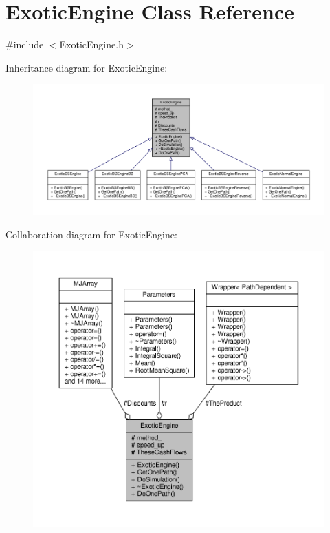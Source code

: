 \hypertarget{classExoticEngine}{}\section{Exotic\+Engine Class Reference}
\label{classExoticEngine}


{\ttfamily \#include $<$Exotic\+Engine.\+h$>$}



Inheritance diagram for Exotic\+Engine\+:
\nopagebreak
\begin{figure}[H]
\begin{center}
\leavevmode
\includegraphics[width=350pt]{classExoticEngine__inherit__graph}
\end{center}
\end{figure}


Collaboration diagram for Exotic\+Engine\+:
\nopagebreak
\begin{figure}[H]
\begin{center}
\leavevmode
\includegraphics[width=350pt]{classExoticEngine__coll__graph}
\end{center}
\end{figure}
